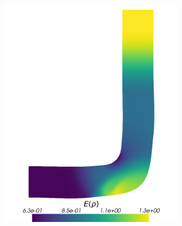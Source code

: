 \begin{figure}[H]
\begin{subfigure}{0.3\linewidth}
		\includegraphics[scale=0.18]{figs/pipe/euler2D_pipe_adipm_n1-2_ERho.png}
		\caption{}
		\label{fig:adIPMSolutionsPipeSGE}
	\end{subfigure}%
	\hfill
	\begin{subfigure}{0.3\linewidth}
		\centering

\end{subfigure}
\end{figure}
